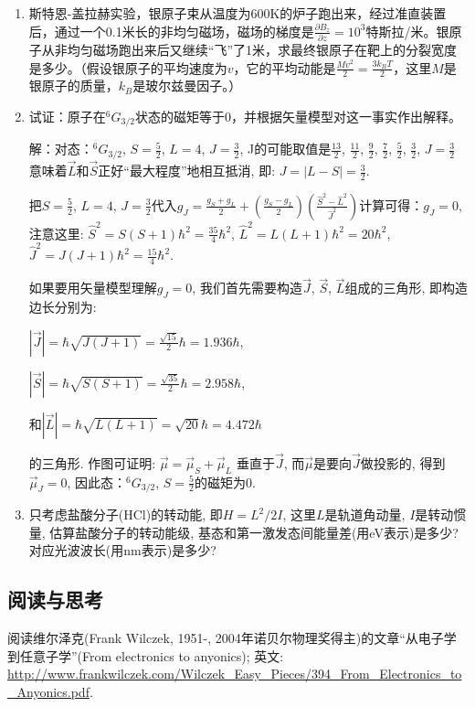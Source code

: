 \begin{enumerate}
\item 

斯特恩-盖拉赫实验，银原子束从温度为600K的炉子跑出来，经过准直装置后，通过一个0.1米长的非均匀磁场，磁场的梯度是$\frac{\partial B_z}{\partial z} = 10^3$特斯拉/米。银原子从非均匀磁场跑出来后又继续“飞”了1米，求最终银原子在靶上的分裂宽度是多少。（假设银原子的平均速度为$v$，它的平均动能是$\frac{M v^2}{2} = \frac{3 k_B T}{2}$，这里$M$是银原子的质量，$k_B$是玻尔兹曼因子。）

\item
  试证：原子在${}^6G_{3/2}$状态的磁矩等于0，并根据矢量模型对这一事实作出解释。

解：对态：${}^6G_{3/2}$, $S=\frac{5}{2}$, $L=4$, $J=\frac{3}{2}$,
J的可能取值是$\frac{13}{2}$, $\frac{11}{2}$, $\frac{9}{2}$,
$\frac{7}{2}$, $\frac{5}{2}$, $\frac{3}{2}$,
$J=\frac{3}{2}$意味着$\vec L$和$\vec S$正好``最大程度''地相互抵消,
即: $J = |L-S|=\frac{3}{2}$.

把$S=\frac{5}{2}$, $L=4$, $J=\frac{3}{2}$代入$g_J =  \frac{g_S +
g_L}{2} + \left(\frac{g_S - g_L}{2} \right)\left(\frac{\hat S^2 -
\hat L^2}{\hat J^2} \right) $计算可得：$g_J =0$, 注意这里: $\hat S^2
= S(S+1)\hbar^2 = \frac{35}{4}\hbar^2$, $\hat L^2 =
L(L+1)\hbar^2=20\hbar^2$, $\hat J^2 =
J(J+1)\hbar^2=\frac{15}{4}\hbar^2$.

如果要用矢量模型理解$g_J =0$, 我们首先需要构造$\vec J$, $\vec S$,
$\vec L$组成的三角形, 即构造边长分别为:


$|\vec J|=\hbar \sqrt{J(J+1)}=\frac{\sqrt {15}}{2}\hbar=1.936\hbar$,


$|\vec S|=\hbar\sqrt{S(S+1)}=\frac{\sqrt{35}}{2}\hbar=2.958\hbar$,


和$|\vec L|=\hbar\sqrt{L(L+1)}=\sqrt {20} \hbar=4.472\hbar$

的三角形. 作图可证明: $\vec \mu = \vec \mu_S + \vec \mu_L$
垂直于$\vec J$, 而$\vec \mu$是要向$\vec J$做投影的, 得到$\vec
\mu_J=0$, 因此态：${}^6G_{3/2}$, $S=\frac{5}{2}$的磁矩为0.


  \item 只考虑盐酸分子(HCl)的转动能, 即$H = L^2/2I$, 这里$L$是轨道角动量,
$I$是转动惯量, 估算盐酸分子的转动能级,
基态和第一激发态间能量差(用eV表示)是多少?
对应光波波长(用nm表示)是多少?

\end{enumerate}

\subsection*{阅读与思考}

阅读维尔泽克(Frank Wilczek, 1951-,
2004年诺贝尔物理奖得主)的文章``从电子学到任意子学''(From electronics
to anyonics); 英文:
\url{http://www.frankwilczek.com/Wilczek_Easy_Pieces/394_From_Electronics_to_Anyonics.pdf}.